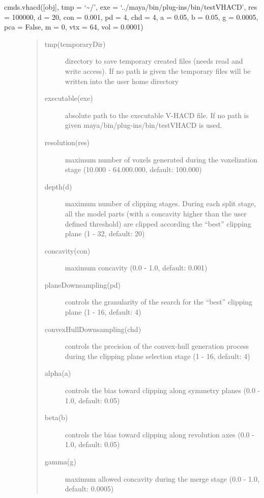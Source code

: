 \documentclass[letterpaper,10pt,english]{sphinxmanual}
\begin{document}
 cmds.vhacd({[}obj{]}, tmp = ‘\textasciitilde{}/’, exe = ‘../maya/bin/plug-ins/bin/testVHACD’, res = 100000, d = 20, con = 0.001, pd = 4, chd = 4, a = 0.05, b = 0.05, g = 0.0005, pca = False, m = 0, vtx = 64, vol = 0.0001)
\begin{description}
\item[{}] \leavevmode\begin{quote}\begin{description}
\item[{tmp(temporaryDir)}] \leavevmode
directory to save temporary created files (needs read and write access). If no path is given the temporary files will be written into the user home directory

\item[{executable(exe)}] \leavevmode
absolute path to the executable V-HACD file. If no path is given maya/bin/plug-ins/bin/testVHACD is used.

\item[{resolution(res)}] \leavevmode
maximum number of voxels generated during the voxelization stage (10.000 - 64.000.000, default: 100.000)

\item[{depth(d)}] \leavevmode
maximum number of clipping stages. During each split stage, all the model parts (with a concavity higher than the user defined threshold) are clipped according the “best” clipping plane (1 - 32, default: 20)

\item[{concavity(con)}] \leavevmode
maximum concavity (0.0 - 1.0, default: 0.001)

\item[{planeDownsampling(pd)}] \leavevmode
controls the granularity of the search for the “best” clipping plane (1 - 16, default: 4)

\item[{convexHullDownsampling(chd)}] \leavevmode
controls the precision of the convex-hull generation process during the clipping plane selection stage (1 - 16, default: 4)

\item[{alpha(a)}] \leavevmode
controls the bias toward clipping along symmetry planes (0.0 - 1.0, default: 0.05)

\item[{beta(b)}] \leavevmode
controls the bias toward clipping along revolution axes (0.0 - 1.0, default: 0.05)

\item[{gamma(g)}] \leavevmode
maximum allowed concavity during the merge stage (0.0 - 1.0, default: 0.0005)


\end{description}
\end{quote}
\end{description}
\end{document}

